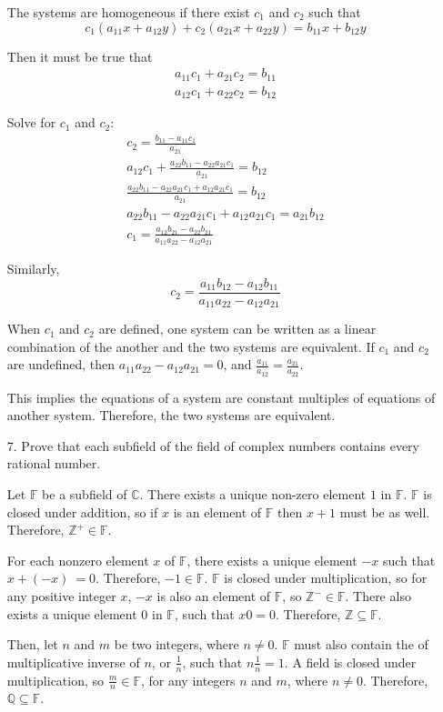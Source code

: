 \documentclass{article}
\begin{document}
\begin{enumerate}[listparindent=\parindent]
The systems are homogeneous if there exist \(c_1\) and \(c_2\) such that
\[ c_1(a_{11}x + a_{12}y) + c_2(a_{21}x + a_{22}y) = b_{11}x + b_{12}y \]

Then it must be true that
\begin{gather*}
    a_{11}c_1 + a_{21}c_2 = b_{11} \\
    a_{12}c_1 + a_{22}c_2 = b_{12}
\end{gather*}

Solve for \(c_1\) and \(c_2\):
\begin{gather*}
    c_2 = \frac{b_{11} - a_{11}c_1} {a_{21}} \\
    a_{12}c_1 + \frac{a_{22}b_{11} - a_{22}a_{21}c_1} {a_{21}} = b_{12} \\
    \frac{a_{22}b_{11} - a_{22}a_{21}c_1 + a_{12}a_{21}c_1} {a_{21}} = b_{12} \\
    a_{22}b_{11} - a_{22}a_{21}c_1 + a_{12}a_{21}c_1 = a_{21}b_{12} \\
    c_1 = \frac{a_{12}b_{21} - a_{22}b_{21}} {a_{11}a_{22} - a_{12}a_{21}}
\end{gather*}

Similarly,
\[ c_2 = \frac{a_{11}b_{12} - a_{12}b_{11}} {a_{11}a_{22} - a_{12}a_{21}} \]

When \(c_1\) and \(c_2\) are defined, one system can be written
as a linear combination of the another and the two systems are equivalent.
If \(c_1\) and \(c_2\) are undefined, then
\( a_{11}a_{22} - a_{12}a_{21} = 0 \), and
\( \frac{a_{11}}{a_{12}} = \frac{a_{21}}{a_{22}} \).

This implies the equations of a system are constant multiples of equations of another system.
Therefore, the two systems are equivalent.

\item[7.] Prove that each subfield of the field of complex numbers contains every rational number.

Let \(\mathbb F\) be a subfield of \(\mathbb C\).
There exists a unique non-zero element \(1\) in \(\mathbb F\).
\(\mathbb F\) is closed under addition, so if \(x\) is an element of \(\mathbb F\) then \(x + 1\) must be as well.
Therefore, \(\mathbb Z^+ \in \mathbb F\).

For each nonzero element \(x\) of \(\mathbb F\), there exists a unique element \(-x\) such that \(x + (-x)\ = 0\).
Therefore, \(-1 \in \mathbb F\).
\(\mathbb F\) is closed under multiplication, so for any positive integer \(x\), \(-x\) is also an element of \(\mathbb F\),
so \(\mathbb Z^- \in \mathbb F\).
There also exists a unique element \(0\) in \(\mathbb F\), such that \(x0 = 0\).
Therefore, \(\mathbb Z \subseteq \mathbb F\).

Then, let \(n\) and \(m\) be two integers, where \(n \neq 0\).
\(\mathbb F\) must also contain the of multiplicative inverse of \(n\), or \(\frac{1}{n}\), such that \(n\frac{1}{n} = 1\).
A field is closed under multiplication, so \(\frac{m}{n} \in \mathbb F\),
for any integers \(n\) and \(m\), where \(n \neq 0\).
Therefore, \(\mathbb Q \subseteq \mathbb F\).

\end{enumerate}
\end{document}
